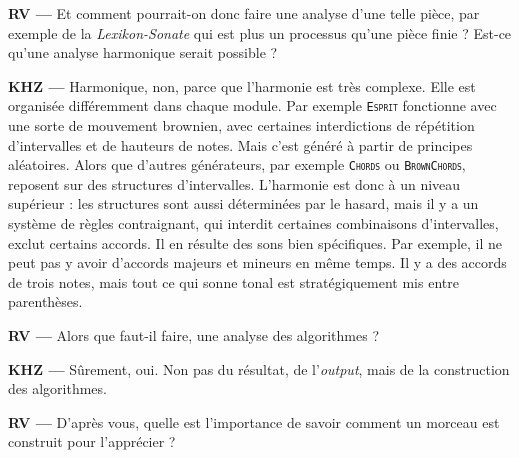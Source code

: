 \documentclass[a4paper,12pt]{article}
\newcommand{\module}[1]{\texttt{\textsc{#1}}}
\begin{document}
\textbf{RV ---} Et comment pourrait-on donc faire une analyse d'une telle pièce, par exemple de la \emph{Lexikon-Sonate} qui est plus un processus qu'une pièce finie ? Est-ce qu'une analyse harmonique serait possible ?

\textbf{KHZ ---} Harmonique, non, parce que l'harmonie est très complexe. Elle est organisée différemment dans chaque module. Par exemple \module{Esprit} fonctionne avec une sorte de mouvement brownien, avec certaines interdictions de répétition d'intervalles et de hauteurs de notes. Mais c'est généré à partir de principes aléatoires. Alors que d'autres générateurs, par exemple \module{Chords} ou \module{BrownChords}, reposent sur des structures d'intervalles. L'harmonie est donc à un niveau supérieur : les structures sont aussi déterminées par le hasard, mais il y a un système de règles contraignant, qui interdit certaines combinaisons d'intervalles, exclut certains accords. Il en résulte des sons bien spécifiques. Par exemple, il ne peut pas y avoir d'accords majeurs et mineurs en même temps. Il y a des accords de trois notes, mais tout ce qui sonne tonal est stratégiquement mis entre parenthèses.

\textbf{RV ---} Alors que faut-il faire, une analyse des algorithmes ?

\textbf{KHZ ---} Sûrement, oui. Non pas du résultat, de l'\emph{output}, mais de la construction des algorithmes.

\textbf{RV ---} D'après vous, quelle est l'importance de savoir comment un morceau est construit pour l'apprécier ?
\end{document}
